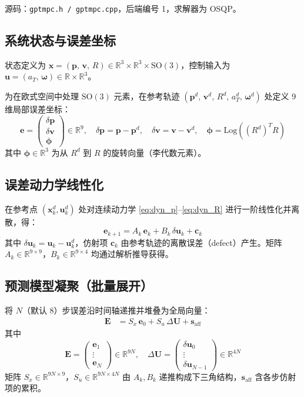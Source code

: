\documentclass[UTF8, a4paper, 11pt]{ctexart}
\newcommand{\SO}{\mathrm{SO}(3)}
\newcommand{\R}{\mathbb{R}}
\newcommand{\bx}{\mathbf{x}}
\newcommand{\bu}{\mathbf{u}}
\newcommand{\bp}{\mathbf{p}}
\newcommand{\bv}{\mathbf{v}}
\newcommand{\bw}{\boldsymbol{\omega}}
\newcommand{\Log}{\mathrm{Log}}
\begin{document}
源码：\texttt{gptmpc.h / gptmpc.cpp}，后端编号 1，求解器为 OSQP。

\subsection{系统状态与误差坐标}

状态定义为 $\bx = (\bp,\,\bv,\,R) \in \R^3\times\R^3\times\SO$，控制输入为 $\bu = (a_T,\,\bw)\in\R\times\R^3$。

为在欧式空间中处理 $\SO$ 元素，在参考轨迹 $(\bp^d,\,\bv^d,\,R^d,\,a_T^d,\,\bw^d)$ 处定义 9 维局部误差坐标：
\begin{equation}
  \mathbf{e} = \begin{pmatrix}\delta\bp\\\delta\bv\\\boldsymbol{\phi}\end{pmatrix} \in \R^9, \quad
  \delta\bp = \bp-\bp^d,\quad \delta\bv = \bv-\bv^d,\quad \boldsymbol{\phi} = \Log\!\left((R^d)^T R\right)
\end{equation}
其中 $\boldsymbol{\phi}\in\R^3$ 为从 $R^d$ 到 $R$ 的旋转向量（李代数元素）。

\subsection{误差动力学线性化}

在参考点 $(\bx^d_k, \bu^d_k)$ 处对连续动力学 \eqref{eq:dyn_p}--\eqref{eq:dyn_R} 进行一阶线性化并离散，得：
\begin{equation}
  \mathbf{e}_{k+1} = A_k\,\mathbf{e}_k + B_k\,\delta\bu_k + \mathbf{c}_k
  \tag{M4}
\end{equation}
其中 $\delta\bu_k = \bu_k - \bu^d_k$，仿射项 $\mathbf{c}_k$ 由参考轨迹的离散误差（defect）产生。矩阵 $A_k\in\R^{9\times9}$，$B_k\in\R^{9\times4}$ 均通过解析推导获得。

\subsection{预测模型凝聚（批量展开）}

将 $N$（默认 8）步误差沿时间轴递推并堆叠为全局向量：
\begin{align}
  \mathbf{E} &= S_x\,\mathbf{e}_0 + S_u\,\Delta\mathbf{U} + \mathbf{s}_{\text{aff}}
  \tag{M5}
\end{align}
其中
\[
  \mathbf{E} = \begin{pmatrix}\mathbf{e}_1\\\vdots\\\mathbf{e}_N\end{pmatrix} \in \R^{9N},\quad
  \Delta\mathbf{U} = \begin{pmatrix}\delta\bu_0\\\vdots\\\delta\bu_{N-1}\end{pmatrix} \in \R^{4N}
\]
矩阵 $S_x\in\R^{9N\times9}$，$S_u\in\R^{9N\times4N}$ 由 $A_k, B_k$ 递推构成下三角结构，$\mathbf{s}_{\text{aff}}$ 含各步仿射项的累积。
\end{document}
